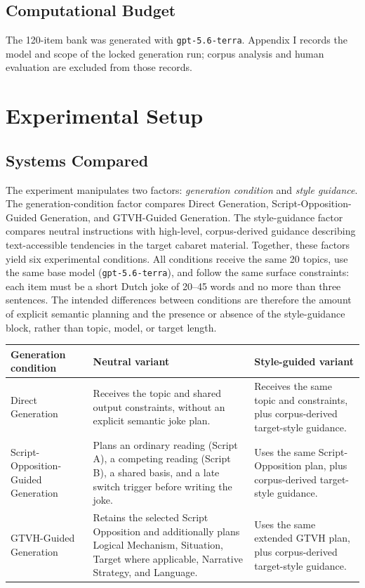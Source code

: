 \documentclass[11pt]{article}
\begin{document}
\subsection{Computational Budget}\label{computational-budget}

The 120-item bank was generated with \texttt{gpt-5.6-terra}. Appendix I records the model and scope of the locked generation run; corpus analysis and human evaluation are excluded from those records.

\section{Experimental Setup}\label{experimental-setup}

\subsection{Systems Compared}\label{systems-compared}

The experiment manipulates two factors: \emph{generation condition} and \emph{style guidance}. The generation-condition factor compares Direct Generation, Script-Opposition-Guided Generation, and GTVH-Guided Generation. The style-guidance factor compares neutral instructions with high-level, corpus-derived guidance describing text-accessible tendencies in the target cabaret material. Together, these factors yield six experimental conditions. All conditions receive the same 20 topics, use the same base model (\texttt{gpt-5.6-terra}), and follow the same surface constraints: each item must be a short Dutch joke of 20--45 words and no more than three sentences. The intended differences between conditions are therefore the amount of explicit semantic planning and the presence or absence of the style-guidance block, rather than topic, model, or target length.

\begin{table}[t]\centering\scriptsize\begin{tabularx}{\textwidth}{YYY}
\toprule\noalign{}
Generation condition & Neutral variant & Style-guided variant \\
\midrule\noalign{}

\bottomrule\noalign{}

Direct Generation & Receives the topic and shared output constraints, without an explicit semantic joke plan. & Receives the same topic and constraints, plus corpus-derived target-style guidance. \\
Script-Opposition-Guided Generation & Plans an ordinary reading (Script A), a competing reading (Script B), a shared basis, and a late switch trigger before writing the joke. & Uses the same Script-Opposition plan, plus corpus-derived target-style guidance. \\
GTVH-Guided Generation & Retains the selected Script Opposition and additionally plans Logical Mechanism, Situation, Target where applicable, Narrative Strategy, and Language. & Uses the same extended GTVH plan, plus corpus-derived target-style guidance. \\
\end{tabularx}\end{table}
\end{document}
